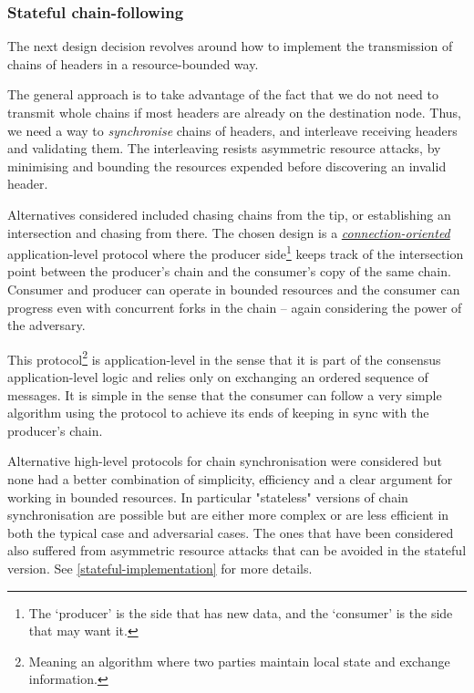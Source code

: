 \documentclass[11pt,a4paper]{article}
\begin{document}
\subsubsection{Stateful chain-following}
\label{stateful-chain-following}

The next design decision revolves around how to implement the
transmission of chains of headers in a resource-bounded way.

The general approach is to take advantage of the fact that we do not
need to transmit whole chains if most headers are already on the
destination node. Thus, we need a way to \emph{synchronise} chains of
headers, and interleave receiving headers and validating them. The
interleaving resists asymmetric resource attacks, by minimising and
bounding the resources expended before discovering an invalid header.

Alternatives considered included chasing chains from the tip, or
establishing an intersection and chasing from there. The chosen design
is a
\emph{\href{https://en.wikipedia.org/wiki/Connection-oriented_communication}{{connection-oriented}}}
application-level protocol where the producer side\footnote{The
  `producer' is the side that has new data, and the `consumer' is the
  side that may want it.} keeps track of the intersection point between
the producer's chain and the consumer's copy of the same chain. Consumer
and producer can operate in bounded resources and the consumer can
progress even with concurrent forks in the chain -- again considering
the power of the adversary.

This protocol\footnote{Meaning an algorithm where two parties maintain
  local state and exchange information.} is application-level in the
sense that it is part of the consensus application-level logic and
relies only on exchanging an ordered sequence of messages. It is simple
in the sense that the consumer can follow a very simple algorithm using
the protocol to achieve its ends of keeping in sync with the producer's
chain.

Alternative high-level protocols for chain synchronisation were
considered but none had a better combination of simplicity, efficiency
and a clear argument for working in bounded resources. In particular
"stateless" versions of chain synchronisation are possible but are
either more complex or are less efficient in both the typical case and
adversarial cases. The ones that have been considered also suffered from
asymmetric resource attacks that can be avoided in the stateful version.
See \cref{stateful-implementation} for more
details.
\end{document}
